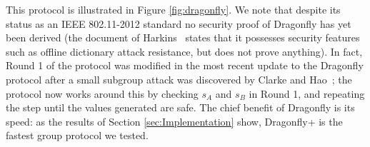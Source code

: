 This protocol is illustrated in Figure \ref{fig:dragonfly}.  We note that despite its status as an IEEE 802.11-2012 standard no security
proof of Dragonfly has yet been derived (the document of Harkins~\cite{Ha15} states that it possesses security features such as offline
dictionary attack resistance, but does not prove anything).  In fact, Round 1 of the protocol was modified in the most recent update      %
to the Dragonfly protocol after a small subgroup attack was discovered by Clarke and Hao~\cite{Ha2014}; the protocol now works around this
by checking $s_A$ and $s_B$ in Round 1, and repeating the step until the values generated are safe. The chief benefit of Dragonfly is its speed:
as the results of Section \ref{sec:Implementation} show, Dragonfly+ is the fastest group protocol we tested.

